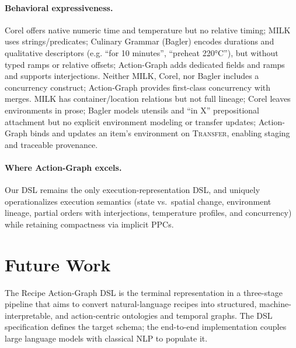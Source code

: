 \documentclass[sigconf]{acmart}
\begin{document}
\paragraph{Behavioral expressiveness.} Corel offers native numeric time and temperature but no relative timing; MILK uses strings/predicates; Culinary Grammar (Bagler) encodes durations and qualitative descriptors (e.g. ``for 10 minutes'', ``preheat 220°C''), but without typed ramps or relative offsets; Action-Graph adds dedicated fields and ramps and supports interjections. Neither MILK, Corel, nor Bagler includes a concurrency construct; Action-Graph provides first-class concurrency with merges. MILK has container/location relations but not full lineage; Corel leaves environments in prose; Bagler models utensils and ``in X'' prepositional attachment but no explicit environment modeling or transfer updates; Action-Graph binds and updates an item’s environment on \textsc{Transfer}, enabling staging and traceable provenance.

\paragraph{Where Action-Graph excels.} Our DSL remains the only execution-representation DSL, and uniquely operationalizes execution semantics (state vs.\ spatial change, environment lineage, partial orders with interjections, temperature profiles, and concurrency) while retaining compactness via implicit PPCs.

\section{Future Work}

The Recipe Action-Graph DSL is the terminal representation in a three-stage pipeline that aims to convert natural-language recipes into structured, machine-interpretable, and action-centric ontologies and temporal graphs. The DSL specification defines the target schema; the end-to-end implementation couples large language models with classical NLP to populate it.
\end{document}
